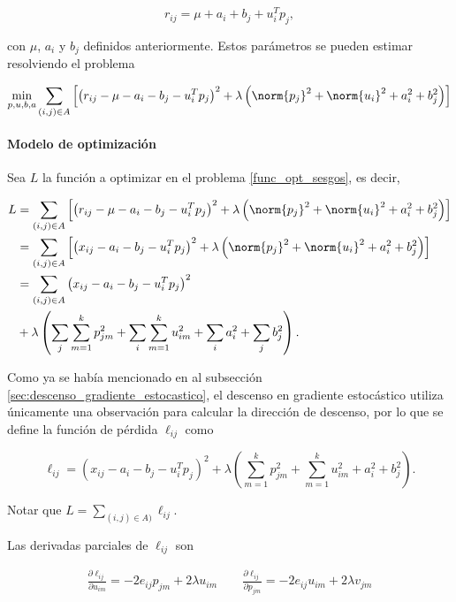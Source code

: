 \begin{equation}\label{ec_fact_sesgo}
r_{ij} = \mu + a_i + b_j + u_i^T p_j,
\end{equation}

con $\mu$, $a_i$ y $b_j$ definidos anteriormente. Estos parámetros se pueden estimar resolviendo el problema

\begin{equation}\label{func_opt_sesgos}
  \min_{p, u, b, a} \sum_{(i,j) \in A} \left [ \left( r_{ij} - \mu - a_i - b_j - u_i^T p_j \right) ^2 + \lambda \left( \norm{p_j}^2 + \norm{u_i}^2 + a_i^2 + b_j^2 \right) \right ]
\end{equation}

\paragraph{Modelo de optimización}

Sea $L$ la función a optimizar en el problema \ref{func_opt_sesgos}, es decir,

\[
\begin{split}
L 
& = \sum_{(i,j) \in A} \left [ \left( r_{ij} - \mu - a_i - b_j - u_i^T p_j \right) ^2 + 
\lambda \left( \norm{p_j}^2 + \norm{u_i}^2 + a_i^2 + b_j^2 \right) \right ] \\
& = \sum_{(i,j) \in A} \left [ \left( x_{ij} - a_i - b_j - u_i^T p_j \right) ^2 + \lambda \left( \norm{p_j}^2 + \norm{u_i}^2 + a_i^2 + b_j^2 \right) \right ] \\
& = \sum_{(i,j) \in A} \left( x_{ij} - a_i - b_j - u_i^T p_j \right) ^2 \\
& + \lambda \left( 
\sum_j \sum_{m = 1}^{k}p_{jm}^2 + 
\sum_i \sum_{m = 1}^{k}u_{im}^2 + 
\sum_i a_i^2 + 
\sum_j b_j^2 \right) .
\end{split}
\]

Como ya se había mencionado en al subsección \ref{sec:descenso_gradiente_estocastico}, el descenso en gradiente estocástico utiliza únicamente una observación para calcular la dirección de descenso, por lo que se define la función de pérdida $\ell_{ij}$ como

\[
\ell_{ij} = \left( x_{ij} - a_i - b_j - u_i^T p_j \right) ^2
+ \lambda \left( 
\sum_{m = 1}^{k}p_{jm}^2 + 
\sum_{m = 1}^{k}u_{im}^2 + 
a_i^2 + 
b_j^2 \right) .
\]

Notar que $L = \sum_{(i,j) \in A)} \ell_{ij}$.

Las derivadas parciales de $\ell_{ij}$ son

\[
\begin{split}
\frac{\partial \ell_{ij}}{\partial u_{im}} = -2 e_{ij} p_{jm} + 2 \lambda u_{im} 
\qquad
\frac{\partial \ell_{ij}}{\partial p_{jm}} = -2 e_{ij} u_{im} + 2 \lambda v_{jm}
\end{split}
\]


